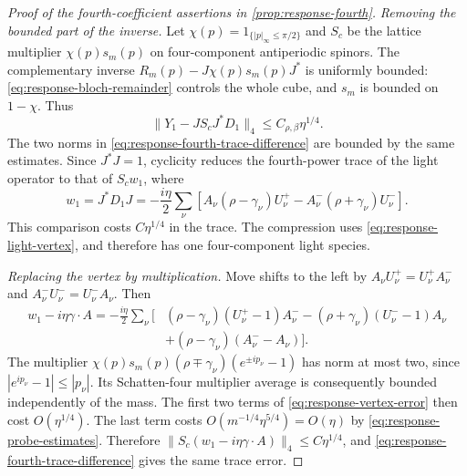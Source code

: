 \documentclass[11pt,letterpaper,reqno]{amsart}
\begin{document}
\begin{proof}[Proof of the fourth-coefficient assertions in \cref{prop:response-fourth}]
\emph{Removing the bounded part of the inverse.}
Let $\chi(p)=1_{\{|p|_\infty\le\pi/2\}}$ and
$S_c$ be the lattice multiplier $\chi(p)s_m(p)$ on
four-component antiperiodic spinors. The complementary
inverse
$R_m(p)-J\chi(p)s_m(p)J^*$ is uniformly bounded:
\eqref{eq:response-bloch-remainder} controls the whole
cube, and $s_m$ is bounded on $1-\chi$. Thus
\[
 \|Y_1-JS_cJ^*D_1\|_4\le C_{\rho,\beta}\eta^{1/4}.
\]
The two norms in \eqref{eq:response-fourth-trace-difference}
are bounded by the same estimates. Since $J^*J=1$,
cyclicity reduces the fourth-power trace of the light
operator to that of $S_cw_1$, where
\begin{equation}\label{eq:response-compressed-vertex}
 w_1=J^*D_1J=-\frac{i\eta}{2}\sum_\nu
       [A_\nu(\rho-\gamma_\nu)U_\nu^+
             -A_\nu^-(\rho+\gamma_\nu)U_\nu^-].
\end{equation}
This comparison costs $C\eta^{1/4}$ in the trace. The
compression uses \eqref{eq:response-light-vertex}, and
therefore has one four-component light species.

\emph{Replacing the vertex by multiplication.}
Move shifts to the left by
$A_\nu U_\nu^+=U_\nu^+A_\nu^-$ and
$A_\nu^-U_\nu^-=U_\nu^-A_\nu$. Then
\begin{equation}\label{eq:response-vertex-error}
 \begin{split}
 w_1-i\eta\gamma\cdot A=-\frac{i\eta}{2}\sum_\nu\big[&
  (\rho-\gamma_\nu)(U_\nu^+-1)A_\nu^-
       -(\rho+\gamma_\nu)(U_\nu^--1)A_\nu\\
       &+(\rho-\gamma_\nu)(A_\nu^--A_\nu)\big].
 \end{split}
\end{equation}
The multiplier
$\chi(p)s_m(p)(\rho\mp\gamma_\nu)(e^{\pm ip_\nu}-1)$
has norm at most two, since $|e^{ip_\nu}-1|\le|p_\nu|$.
Its Schatten-four multiplier average is consequently
bounded independently of the mass. The first two terms
of \eqref{eq:response-vertex-error} then cost
$O(\eta^{1/4})$. The last term costs
$O(m^{-1/4}\eta^{5/4})=O(\eta)$ by
\eqref{eq:response-probe-estimates}. Therefore
$\|S_c(w_1-i\eta\gamma\cdot A)\|_4\le C\eta^{1/4}$,
and \eqref{eq:response-fourth-trace-difference} gives
the same trace error.


\end{proof}
\end{document}

